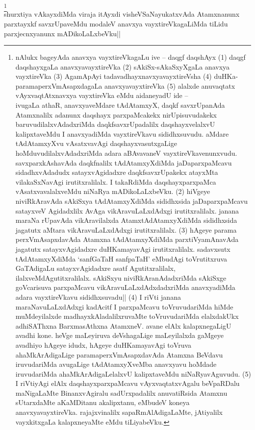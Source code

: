 \begin{artha} 
\footnote[1]{nAlukx bageyAda anavxya vayxtireVkagaLu ive -- daqgf 
daqshAyx (1) daqgf daqshayxgaLa anavxyavayxtireVka (2) 
sAkiSx-sAkaSxyXgaLa anavxya vayxtireVka (3) AgamApAyi 
tadavadhayxnavxyavayxtireVsha (4) duHKa-paramaperxVmAsapxdagaLa 
anavxyavayxtireVka (5) alalxde anuvaqtatx vAyxvaqtAtxnavxya 
vayxtireVka eMdu aidaneyadU ide --\\ 
ivugaLa athaR, anavxyaveMdare tAdAtamxyX, daqkf savxrUpanAda 
Atamxnalilx adanunx daqshayx parxpaMcakekx nirUpisuvudakekx 
baruvudilalxvAdadxriMda daqkfsavxrUpadalilx daqshayxvelalxvU 
kalipxtaveMdu I anavxyadiMda vayxtireVkavu sididhxsuvudu. aMdare 
tAdAtamxyXvu vAsatxvavAgi daqshayxvasutxgaLige 
hoMduvudilalxvAdadxriMda adara aBAvavaneV vayxtireVkavenunxvudu. 
savxparxkAshavAda daqkfnalilx tAdAtamxyXdiMda jaDaparxpaMcavu 
sidadhxvAdadudx satayxvAgidadxre daqkfsavxrUpakekx atayxMta 
vilakaSxNavAgi irutitxralilalx. I takaRdiMda daqshayxparxpaMca 
vAsatxvavalalxveMdu niNaRya mADikoLaLxbeVku. (2) hiVgeye niviRkAravAda 
sAkiSxya tAdAtamxyXdiMda sididhxsida jaDaparxpaMcavu satayxveV 
Agidadxlilx AvAga vikAravuLaLxdAdxgi irutitxralilalx. janana maraNa 
rUpavAda vikAravilalxda AtamxtAdAtamxyXdiMda sididhxsida jagatutx 
aMtara vikAravuLaLxdAdxgi irutitxralilalx. (3) hAgeye parama 
perxVmAsapxdavAda Atamxna tAdAtamxyXdiMda parxtiVyamAnavAda jagatutx 
satayxvAgidadxre duHKamayavAgi irutitxralilalx. sadavxsutx 
tAdAtamxyXdiMda `sanfGaTaH sanfpaTaH' eMbudAgi toVrutitxruva 
GaTAdigaLu satayxvAgidadxre asatf Agutitxralilalx, 
ilalxveMdAgutitxralilalx. sAkiSxyu niviRkAranAdadxriMda sAkiSxge 
goVcarisuva parxpaMcavu vikAravuLaLxdAdxdadxriMda anavxyadiMda adara 
vayxtireVkavu sididhxsuvadu|| (4) I riVti janana maraNavuLaLxdAdxgi 
kadAcitf I parxpaMcavu toVruvudariMda hiMde muMdeyilalxde 
madhayxkAladalilxruvaMte toVruvudariMda elalxdakUkx adhiSAThxna 
BarxmasAthxna AtamxneV. avane elAlx kalapxnegaLigU avadhi kone. heVge 
maLeyiruva deVshagaLige maLeyilalxda gaMgeye avadhiyo hAgeye idudx, 
hAgeye duHKamayavAgi toVruva ahaMkArAdigaLige paramaperxVmAsapxdavAda 
Atamxna BeVdavu iruvudariMda avugaLige tAdAtamxyXveMba anavxyavu 
hoMdade iruvudariMda ahaMkArAdigaLelalxvU kalipxtaveMdu 
niNaRyavAguvudu. (5) I riVtiyAgi elAlx daqshayxparxpaMcavu 
vAyxvaqtatxvAgalu beVpaRDalu maNigaLaMte BinanxvAgiralu sadUrxpadalilx 
anuvatiRsida Atamxnu sUtarxdaMte aKaMDitanu akalipxtanu, eMbudeV 
koneya anavxyavayxtireVka. rajajxvinalilx sapaRmAlAdigaLaMte, 
jAtiyalilx vayxkitxgaLa kalapxneyaMte eMdu tiLiyabeVku.}\\
shurxtiya vAkayxdiMda viraja itAyxdi visheVSaNayukatxvAda Atamxnanunx 
parxtayxkf savxrUpaveMdu modaleV anavxya vayxtireVkagaLiMda tiLidu 
parxjecnxyanunx mADikoLaLxbeVku||
\end{artha}


